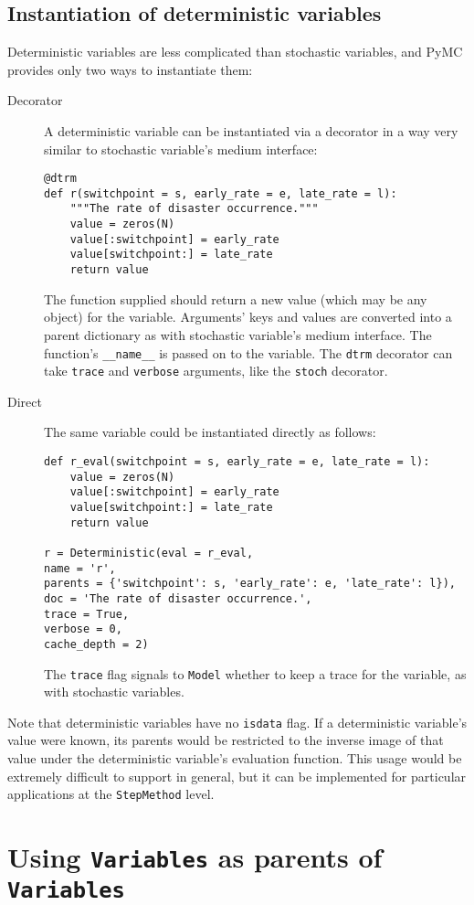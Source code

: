\subsection{Instantiation of deterministic variables}
Deterministic variables are less complicated than stochastic variables, and PyMC provides only two ways to instantiate them:
\begin{description}
    \item[Decorator] A deterministic variable can be instantiated via a decorator in a way very similar to stochastic variable's medium interface:
\begin{verbatim}
@dtrm
def r(switchpoint = s, early_rate = e, late_rate = l):
    """The rate of disaster occurrence."""
    value = zeros(N)
    value[:switchpoint] = early_rate
    value[switchpoint:] = late_rate
    return value
\end{verbatim}
The function supplied should return a new value (which may be any object) for the variable. Arguments' keys and values are converted into a parent dictionary as with stochastic variable's medium interface. The function's \texttt{\_\_name\_\_} is passed on to the variable. The \texttt{dtrm} decorator can take \texttt{trace} and \texttt{verbose} arguments, like the \texttt{stoch} decorator.
    \item[Direct] The same variable could be instantiated directly as follows:
\begin{verbatim}
def r_eval(switchpoint = s, early_rate = e, late_rate = l):
    value = zeros(N)
    value[:switchpoint] = early_rate
    value[switchpoint:] = late_rate
    return value

r = Deterministic(eval = r_eval, 
name = 'r',
parents = {'switchpoint': s, 'early_rate': e, 'late_rate': l}),
doc = 'The rate of disaster occurrence.',
trace = True,
verbose = 0,
cache_depth = 2)
\end{verbatim}
The \texttt{trace} flag signals to \texttt{Model} whether to keep a trace for the variable, as with stochastic variables.
\end{description}

Note that deterministic variables have no \texttt{isdata} flag. If a deterministic variable's value were known, its parents would be restricted to the inverse image of that value under the deterministic variable's evaluation function. This usage would be extremely difficult to support in general, but it can be implemented for particular applications at the \texttt{StepMethod} level.

\section{Using \texttt{Variables} as parents of \texttt{Variables}}

